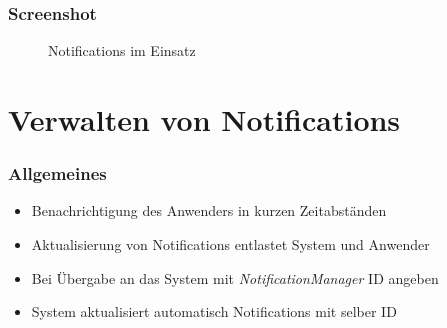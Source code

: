 \begin{frame}
   \frametitle{Screenshot}
   \begin{figure}[h!]
     \centering
     \hfill
     \caption{
        Notifications im Einsatz
     }
     \label{fig:notifications}
   \end{figure}
\end{frame}

\section{Verwalten von Notifications}
\begin{frame}
   \frametitle{Allgemeines}
   \begin{itemize}
      \item Benachrichtigung des Anwenders in kurzen Zeitabständen
      \item Aktualisierung von Notifications entlastet System und Anwender
      \item Bei Übergabe an das System mit \emph{NotificationManager} ID angeben
      \item System aktualisiert automatisch Notifications mit selber ID
   \end{itemize}

   
\end{frame}

